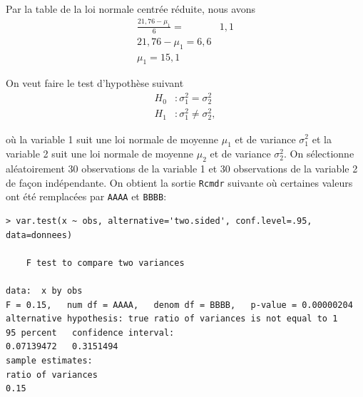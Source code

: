 \begin{questions}
\begin{solution}
Par la table de la loi normale centrée réduite, nous avons
\begin{align*}
    \frac{21,76-\mu_1}{6}=&1,1\\
    21,76-\mu_1=6,6\\
    \mu_1 =15,1
\end{align*}
\end{solution}
\newpage 

\question\label{test2variances}

On veut faire le test d'hypothèse suivant 
\begin{align*}
H_0 &:\sigma_1^2 = \sigma_2^2\\
H_1 &:\sigma_1^2 \neq \sigma_2^2,
\end{align*}

où la variable 1 suit une loi normale de moyenne $\mu_1$ et de variance $\sigma_1^2$ et la variable 2 suit une loi normale de moyenne $\mu_2$ et de variance $\sigma_2^2$. On sélectionne aléatoirement 30 observations de la variable 1 et 30 observations de la variable 2 de façon indépendante. On obtient la sortie \texttt{Rcmdr} suivante où certaines valeurs ont été remplacées par \texttt{AAAA} et \texttt{BBBB}:

\begin{verbatim}
> var.test(x ~ obs, alternative='two.sided', conf.level=.95, data=donnees)

	F test to compare two variances

data:  x by obs
F = 0.15,   num df = AAAA,   denom df = BBBB,   p-value = 0.00000204
alternative hypothesis: true ratio of variances is not equal to 1
95 percent   confidence interval:
0.07139472   0.3151494
sample estimates:
ratio of variances 
0.15
\end{verbatim}

\end{questions}

